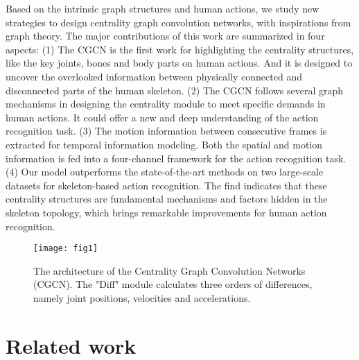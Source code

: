 \documentclass[runningheads]{llncs}
\begin{document}
Based on the intrinsic graph structures and human actions, we study new strategies to design centrality graph convolution networks, with inspirations from graph theory. The major contributions of this work are summarized in four aspects:
(1) The CGCN is the first work for highlighting the centrality structures, like the key joints, bones and body parts on human actions. And it is designed to uncover the overlooked information between physically connected and disconnected parts of the human skeleton. (2) The CGCN follows several graph mechanisms in designing the centrality module to meet specific demands in human actions. It could offer a new and deep understanding of the action recognition task. (3) The motion information between consecutive frames is extracted for temporal information modeling. Both the spatial and motion information is fed into a four-channel framework for the action recognition task. (4) Our model outperforms the state-of-the-art methods on two large-scale datasets for skeleton-based action recognition. The find indicates that these centrality structures are fundamental mechanisms and factors hidden in the skeleton topology, which brings remarkable improvements for human action recognition.
\begin{figure}
\centering
\texttt{[image: fig1]}
\caption{The architecture of the Centrality Graph Convolution Networks (CGCN). The "Diff" module calculates three orders of differences, namely joint positions, velocities and accelerations.}
\label{fig1}
\end{figure}

\section{Related work}
\end{document}
